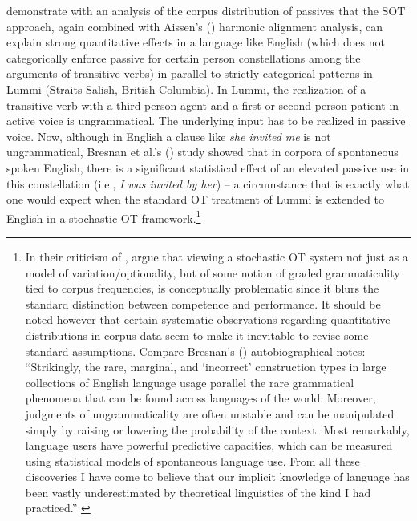 \documentclass[output=paper,hidelinks]{langscibook}
\begin{document}
\citet{BresnanDingareManning2001} demonstrate with an analysis of the corpus distribution of passives that the SOT approach, again combined with Aissen's (\citeyear{Aissen1999}) harmonic alignment analysis, can explain strong quantitative effects in a language like English (which does not categorically enforce passive for certain person constellations among the arguments of transitive verbs) in parallel to strictly categorical patterns in Lummi (Straits Salish, British Columbia). In Lummi, the realization of a transitive verb with a third person agent and a first or second person patient in active voice is ungrammatical. The underlying input has to be realized in passive voice. Now, although in English a clause like \emph{she invited me} is not ungrammatical, Bresnan et al.'s (\citeyear{BresnanDingareManning2001}) study showed that in corpora of spontaneous spoken English, there is a significant statistical effect of an elevated passive use in this constellation (i.e., \emph{I was invited by her}) -- a circumstance that is exactly what one would expect when the standard OT treatment of Lummi is extended to English in a stochastic OT framework.\footnote{In their criticism of \citet{BoersmaHayes2001}, \citet{KellerAsudeh02} argue that viewing a stochastic OT system not just as a model of variation/optionality, but of some notion of graded grammaticality tied to corpus frequencies, is conceptually problematic since it blurs the standard distinction between competence and performance. 
It should be noted however that certain systematic observations regarding quantitative distributions in corpus data seem to make it inevitable to revise some standard assumptions. Compare Bresnan's (\citeyear{Bresnan2011-Reed}) autobiographical notes: ``Strikingly, the rare, marginal, and `incorrect' construction types in large collections of English language usage parallel the rare grammatical phenomena that can be found across languages of the world. Moreover, judgments of ungrammaticality are often unstable and can be manipulated simply by raising or lowering the probability of the context. Most remarkably, language users have powerful predictive capacities, which can be measured using statistical models of spontaneous language use. From all these discoveries I have come to believe that our implicit knowledge of language has been vastly underestimated by theoretical linguistics of the kind I had practiced.'' \citep{Bresnan2011-Reed}}

\end{document}

